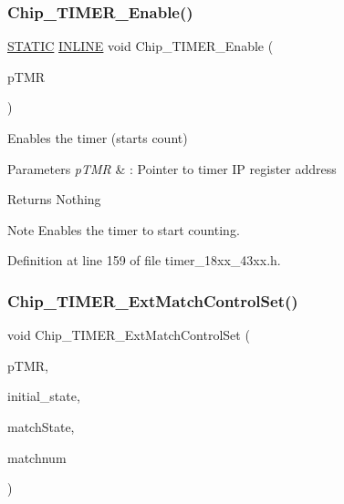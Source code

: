 \subsubsection{\texorpdfstring{Chip\+\_\+\+T\+I\+M\+E\+R\+\_\+\+Enable()}{Chip\_TIMER\_Enable()}}
{\footnotesize\ttfamily \hyperlink{group___l_p_c___types___public___macros_ga10b2d890d871e1489bb02b7e70d9bdfb}{S\+T\+A\+T\+IC} \hyperlink{spifi__18xx__43xx_8h_a2eb6f9e0395b47b8d5e3eeae4fe0c116}{I\+N\+L\+I\+NE} void Chip\+\_\+\+T\+I\+M\+E\+R\+\_\+\+Enable (\begin{DoxyParamCaption}\item[{\hyperlink{struct_l_p_c___t_i_m_e_r___t}{L\+P\+C\+\_\+\+T\+I\+M\+E\+R\+\_\+T} $\ast$}]{p\+T\+MR }\end{DoxyParamCaption})}



Enables the timer (starts count) 


\begin{DoxyParams}{Parameters}
{\em p\+T\+MR} & \+: Pointer to timer IP register address \\
\hline
\end{DoxyParams}
\begin{DoxyReturn}{Returns}
Nothing 
\end{DoxyReturn}
\begin{DoxyNote}{Note}
Enables the timer to start counting. 
\end{DoxyNote}


Definition at line 159 of file timer\+\_\+18xx\+\_\+43xx.\+h.

\mbox{\label{group___t_i_m_e_r__18_x_x__43_x_x_gaf58d175fd6011349b7331055422b9e28}} 
\subsubsection{\texorpdfstring{Chip\+\_\+\+T\+I\+M\+E\+R\+\_\+\+Ext\+Match\+Control\+Set()}{Chip\_TIMER\_ExtMatchControlSet()}}
{\footnotesize\ttfamily void Chip\+\_\+\+T\+I\+M\+E\+R\+\_\+\+Ext\+Match\+Control\+Set (\begin{DoxyParamCaption}\item[{\hyperlink{struct_l_p_c___t_i_m_e_r___t}{L\+P\+C\+\_\+\+T\+I\+M\+E\+R\+\_\+T} $\ast$}]{p\+T\+MR,  }\item[{int8\+\_\+t}]{initial\+\_\+state,  }\item[{\hyperlink{group___t_i_m_e_r__18_x_x__43_x_x_ga15be0f559655d587ad466689f639ab72}{T\+I\+M\+E\+R\+\_\+\+P\+I\+N\+\_\+\+M\+A\+T\+C\+H\+\_\+\+S\+T\+A\+T\+E\+\_\+T}}]{match\+State,  }\item[{int8\+\_\+t}]{matchnum }\end{DoxyParamCaption})}



